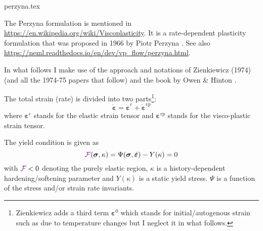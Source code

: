\begin{flushright} {\tiny {\color{gray} perzyna.tex}} \end{flushright}


The Perzyna formulation is mentioned in \url{
https://en.wikipedia.org/wiki/Viscoplasticity}.
It is a rate-dependent plasticity formulation that was proposed in 1966 by Piotr Perzyna \cite{perz66}.
See also \url{https://neml.readthedocs.io/en/dev/vp_flow/perzyna.html}.



In what follows I make use of the approach and notations of Zienkiewicz (1974) \cite{zico74} (and all 
the 1974-75 papers that follow) and the book by Owen \& Hinton \cite{owhi}.

The total strain (rate) is divided into two parts\footnote{Zienkiewicz \cite{zico74} 
adds a third term ${\bm \varepsilon}^0$ which stands for initial/autogenous strain such as due 
to temperature changes but I neglect it in what follows.}:
\[
\dot{\bm \varepsilon} = \dot{\bm \varepsilon}^e + \dot{\bm \varepsilon}^{vp}  
\]
where ${\bm \varepsilon}^e$ stands for the elastic strain tensor and 
${\bm \varepsilon}^{vp}$ stands for the visco-plastic strain tensor.





The yield condition is given as 
\[
{{\color{violet}\cal F}}({\bm \sigma},\kappa) 
= \Psi(\bm\sigma,\dot{\bm \varepsilon}) -Y(\kappa) = 0
\]
with ${{\color{violet}\cal F}}<0$ denoting the purely elastic region, $\kappa$ is a 
history-dependent hardening/softening parameter and $Y(\kappa)$ is a static yield stress.
$\Psi$ is a function of the stress and/or strain rate invariants.

